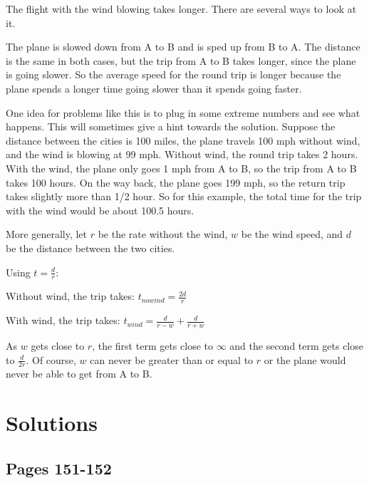 \documentclass[fleqn,addpoints]{exam}
\begin{document}
\begin{solution}
The flight with the wind blowing takes longer.  There are several ways to look at it.

The plane is slowed down from A to B and is sped up from B to A.  The distance is the same in both cases, but the trip
from A to B takes longer, since the plane is going slower.  So the average speed for the round trip is longer because
the plane spends a longer time going slower than it spends going faster.

One idea for problems like this is to plug in some extreme numbers and see what happens.  This will sometimes give a
hint towards the solution.  Suppose the distance between the cities is 100 miles, the plane travels 100 mph without
wind, and the wind is blowing at 99 mph.  Without wind, the round trip takes 2 hours.  With the wind, the plane only
goes 1 mph from A to B, so the trip from A to B takes 100 hours.  On the way back, the plane goes 199 mph, so the return
trip takes slightly more than 1/2 hour.  So for this example, the total time for the trip with the wind would be about
100.5 hours.

More generally, let $r$ be the rate without the wind, $w$ be the wind speed, and $d$ be the distance between the two
cities.  

Using $t = \frac{d}{r}$:
\begin{itemize*}
\item Without wind, the trip takes: $t_{no wind} = \frac{2d}{r}$
\item With wind, the trip takes: $t_{wind} = \frac{d}{r - w} + \frac{d}{r + w}$
\end{itemize*}

As $w$ gets close to $r$, the first term gets close to $\infty$ and the second term gets close to $\frac{d}{2r}$.  Of
course, $w$ can never be greater than or equal to $r$ or the plane would never be able to get from A to B.

\end{solution}

\ifprintanswers

\section{Solutions}

\subsection{Pages 151-152}
\end{document}
